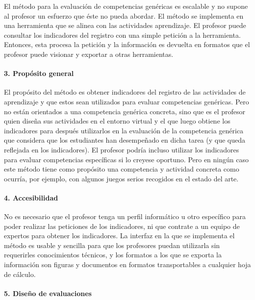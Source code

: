 El método para la evaluación de competencias genéricas es escalable y no supone al profesor un esfuerzo que éste no pueda abordar. El método se implementa en una herramienta que se alinea con las actividades aprendizaje. El profesor puede consultar los indicadores del registro con una simple petición a la herramienta. Entonces, esta procesa la petición y la información es devuelta en formatos que el profesor puede visionar y exportar a otras herramientas.

\paragraph*{3. Propósito general}

El propósito del método es obtener indicadores del registro de las actividades de aprendizaje y que estos sean utilizados para evaluar competencias genéricas. Pero no están orientados a una competencia genérica concreta, sino que es el profesor quien diseña sus actividades en el entorno virtual y el que luego obtiene los indicadores para después utilizarlos en la evaluación de la competencia genérica que considera que los estudiantes han desempeñado en dicha tarea (y que queda reflejada en los indicadores). El profesor podría incluso utilizar los indicadores para evaluar competencias específicas si lo creyese oportuno. Pero en ningún caso este método tiene como propósito una competencia y actividad concreta como ocurría, por ejemplo, con algunos juegos serios recogidos en el estado del arte.

\paragraph*{4. Accesibilidad}

No es necesario que el profesor tenga un perfil informático u otro específico para poder realizar las peticiones de los indicadores, ni que contrate a un equipo de expertos para obtener los indicadores. La interfaz en la que se implementa el método es usable y sencilla para que los profesores puedan utilizarla sin requerirles conocimientos técnicos, y los formatos a los que se exporta la información son figuras y documentos en formatos transportables a cualquier hoja de cálculo.

\paragraph*{5. Diseño de evaluaciones}

